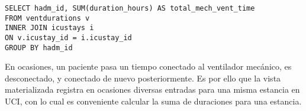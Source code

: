 \documentclass{report}
\begin{document}
\begin{verbatim}
SELECT hadm_id, SUM(duration_hours) AS total_mech_vent_time
FROM ventdurations v
INNER JOIN icustays i
ON v.icustay_id = i.icustay_id
GROUP BY hadm_id
\end{verbatim}

En ocasiones, un paciente pasa un tiempo conectado al ventilador
mecánico, es desconectado, y conectado de nuevo posteriormente. Es por
ello que la vista materializada registra en ocasiones diversas entradas
para una misma estancia en UCI, con lo cual es conveniente calcular la
suma de duraciones para una estancia.
\end{document}
